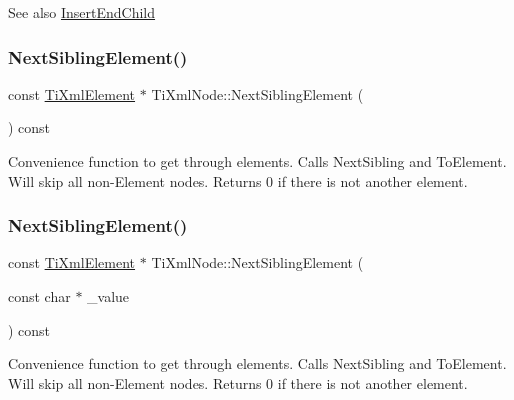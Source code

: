 \begin{DoxySeeAlso}{See also}
\hyperlink{class_ti_xml_node_af287a913ce46d8dbf7ef24fec69bbaf0}{Insert\+End\+Child} 
\end{DoxySeeAlso}
\mbox{\label{class_ti_xml_node_ac6105781c913a42aa7f3f17bd1964f7c}} 
\subsubsection{\texorpdfstring{Next\+Sibling\+Element()}{NextSiblingElement()}\hspace{0.1cm}{\footnotesize\ttfamily [1/2]}}
{\footnotesize\ttfamily const \hyperlink{class_ti_xml_element}{Ti\+Xml\+Element} $\ast$ Ti\+Xml\+Node\+::\+Next\+Sibling\+Element (\begin{DoxyParamCaption}{ }\end{DoxyParamCaption}) const}

Convenience function to get through elements. Calls Next\+Sibling and To\+Element. Will skip all non-\/\+Element nodes. Returns 0 if there is not another element. \mbox{\label{class_ti_xml_node_a22def4746238abaee042f99b47ef3c94}} 
\subsubsection{\texorpdfstring{Next\+Sibling\+Element()}{NextSiblingElement()}\hspace{0.1cm}{\footnotesize\ttfamily [2/2]}}
{\footnotesize\ttfamily const \hyperlink{class_ti_xml_element}{Ti\+Xml\+Element} $\ast$ Ti\+Xml\+Node\+::\+Next\+Sibling\+Element (\begin{DoxyParamCaption}\item[{const char $\ast$}]{\+\_\+value }\end{DoxyParamCaption}) const}

Convenience function to get through elements. Calls Next\+Sibling and To\+Element. Will skip all non-\/\+Element nodes. Returns 0 if there is not another element. \mbox{\label{class_ti_xml_node_a543208c2c801c84a213529541e904b9f}} 

